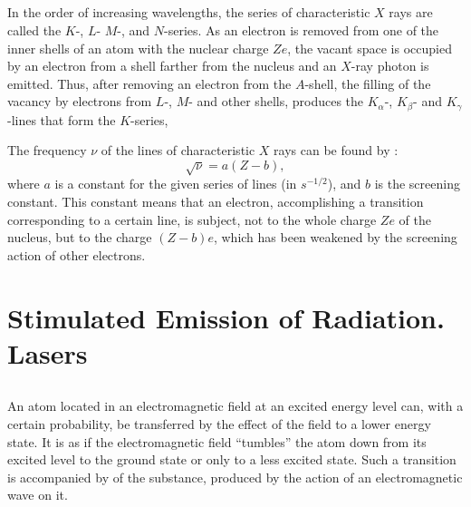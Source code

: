 \subsection{}\label{39.7.9} In the order of increasing wavelengths, the series of characteristic $X$ rays are called the $K$-, $L$- $M$-, and $N$-series. As an electron is removed from one of the inner shells of an atom with the nuclear charge $Ze$, the vacant space is occupied by an electron from a shell farther from the nucleus and an $X$-ray photon is emitted. Thus, after removing an electron from the $A$-shell, the filling of the vacancy by electrons from $L$-, $M$- and other shells, produces the $K_{\alpha}$-, $K_{\beta}$- and $K_{\gamma}$-lines that form the $K$-series,

The frequency $\nu$ of the lines of characteristic $X$ rays can be found by :
\begin{equation*}%
\sqrt{\nu} = a(Z - b),
\end{equation*}
where $a$ is a constant for the given series of lines (in $s^{-1/2}$), and $b$ is the screening constant. This constant means that an electron, accomplishing a transition corresponding to a certain line, is subject, not to the whole charge $Ze$ of the nucleus, but to the charge $(Z - b) e$, which has been weakened by the screening action of other electrons.

\section{Stimulated Emission of Radiation. Lasers}
\label{sec-39.8} 


\subsection{}\label{39.8.1} An atom located in an electromagnetic field at an excited energy level can, with a certain probability, be transferred by the effect of the field to a lower energy state. It is as if the electromagnetic field ``tumbles'' the atom down from its excited level to the ground state or only to a less excited state. Such a transition is accompanied by  of the substance, produced by the action of an electromagnetic wave on it.

